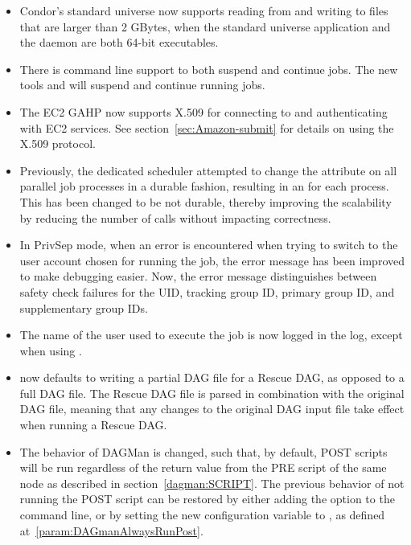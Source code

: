 \begin{itemize}

\item Condor's standard universe now supports reading from and writing to
files that are larger than 2 GBytes,
when the standard universe application and
the  daemon are both 64-bit executables.

\item There is command line support to both suspend and continue jobs. 
The new tools  and  will 
suspend and continue running jobs.

\item The EC2 GAHP now supports X.509 for connecting to and authenticating
with EC2 services.  See section~\ref{sec:Amazon-submit} for details
on using the X.509 protocol.

\item Previously, the dedicated scheduler attempted to change the
 attribute on all parallel job processes in a durable fashion,
resulting in an  for each process.
This has been changed to be not durable, 
thereby improving the scalability by reducing the 
number of  calls without impacting correctness. 

\item In PrivSep mode, when an error is encountered when trying to
switch to the user account chosen for running the job, 
the error message has been improved to make debugging easier.  
Now, the error message distinguishes between safety check failures 
for the UID, tracking group ID, primary group ID, and supplementary group IDs.

\item The name of the user used to execute the job is now logged in
the  log, except when using .

\item {} now defaults to writing a partial DAG file
for a Rescue DAG,
as opposed to a full DAG file.
The Rescue DAG file is parsed in combination with the original DAG file, 
meaning that any
changes to the original DAG input file take effect when running a Rescue DAG.

\item The behavior of DAGMan is changed, such that, by default, 
POST scripts will be run regardless of the return value from 
the PRE script of the same node as described in section~\ref{dagman:SCRIPT}.  
The previous behavior of not running the POST script can be restored by
either adding the  option to the 
command line, 
or by setting the new configuration variable
 to , 
as defined at~\ref{param:DAGmanAlwaysRunPost}.


\end{itemize}
